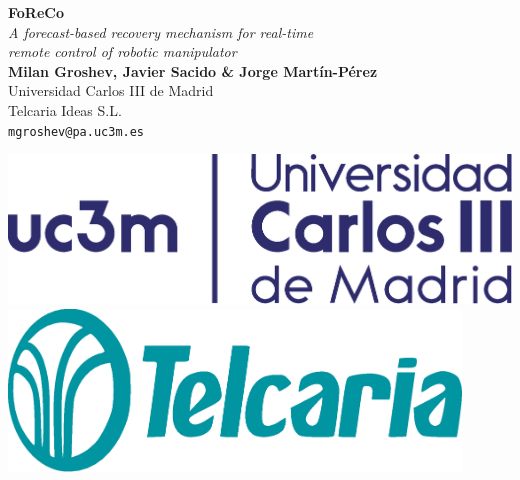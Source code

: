 \documentclass[a0,portrait]{a0poster}
\begin{document}


\begin{minipage}[b]{0.75\linewidth}
    \veryHuge \color{NavyBlue} \textbf{FoReCo} \color{Black}\\[.5cm] %
\Huge\textit{A forecast-based recovery mechanism for real-time\\remote control of robotic manipulator}\\[2cm] %
\huge \textbf{Milan Groshev, Javier Sacido \& Jorge Martín-Pérez}\\[0.5cm] %
\huge Universidad Carlos III de Madrid\\[0.4cm] %
\huge Telcaria Ideas S.L.\\[0.4cm] %
\Large \texttt{mgroshev@pa.uc3m.es}\\ %
\end{minipage}
%
\begin{minipage}[b]{0.25\linewidth}
    \includegraphics[width=15cm]{logo-uc3m.eps}
    \hspace*{2cm}\includegraphics[width=12cm]{logo-telcaria.eps}\\[7cm]
\end{minipage}
\end{document}
